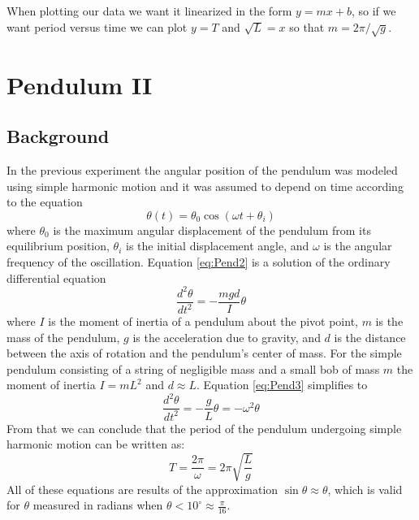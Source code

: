 \documentclass[12pt, a4paper, oneside, openright, titlepage]{book}
\begin{document}
When plotting our data we want it linearized in the form $y = mx+b$, so if we want period versus time we can plot $y = T$ and $\sqrt{L} = x$ so that $m = 2\pi/\sqrt{g}$.






\chapter{Pendulum II}


\section{Background}

In the previous experiment the angular position of the pendulum was modeled using simple harmonic motion and it was assumed to depend on time according to the equation \begin{equation}\label{eq:Pend2}
    \theta(t) = \theta_0\cos(\omega t+\theta_i)
\end{equation}
where $\theta_0$ is the maximum angular displacement of the pendulum from its equilibrium position, $\theta_i$ is the initial displacement angle, and $\omega$ is the angular frequency of the oscillation. Equation \ref{eq:Pend2} is a solution of the ordinary differential equation \begin{equation}\label{eq:Pend3}
    \frac{d^2\theta}{dt^2} = -\frac{mgd}{I}\theta
\end{equation}
where $I$ is the moment of inertia of a pendulum about the pivot point, $m$ is the mass of the pendulum, $g$ is the acceleration due to gravity, and $d$ is the distance between the axis of rotation and the pendulum's center of mass. For the simple pendulum consisting of a string of negligible mass and a small bob of mass $m$ the moment of inertia $I = mL^2$ and $d \approx L$. Equation \ref{eq:Pend3} simplifies to \begin{equation}\label{eq:Pend4}
    \frac{d^2\theta}{dt^2} = -\frac{g}{L}\theta = -\omega^2\theta
\end{equation}
From that we can conclude that the period of the pendulum undergoing simple harmonic motion can be written as: \begin{equation}\label{eq:Pend5}
    T = \frac{2\pi}{\omega} = 2\pi\sqrt{\frac{L}{g}}
\end{equation}
All of these equations are results of the approximation $\sin\theta \approx \theta$, which is valid for $\theta$ measured in radians when $\theta < 10^{\circ} \approx \frac{\pi}{16}$.
\end{document}
